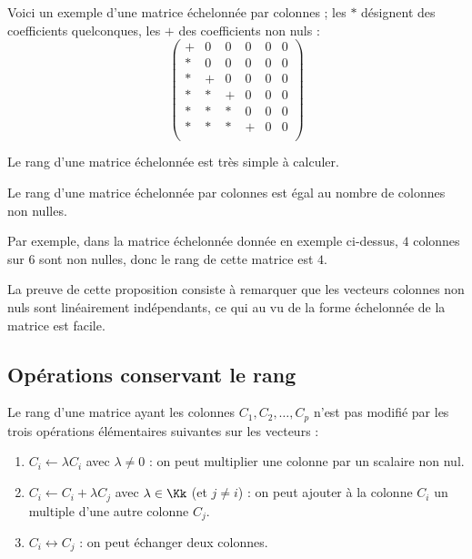 \documentclass[class=report,crop=false]{standalone}
\begin{document}
Voici un exemple d'une matrice échelonnée par colonnes ;
les $*$ désignent des coefficients quelconques, les $+$ des coefficients non nuls :
$$
\begin{pmatrix}
+ & 0 & 0 & 0 & 0 & 0 \\
* & 0 & 0 & 0 & 0 & 0 \\
* & + & 0 & 0 & 0 & 0 \\
* & * & + & 0 & 0 & 0 \\
* & * & * & 0 & 0 & 0 \\
* & * & * & + & 0 & 0 \\
\end{pmatrix}
$$

Le rang d'une matrice échelonnée est très simple à calculer.
\begin{proposition}
\label{prop:rangmatech}
Le rang d'une matrice échelonnée par colonnes est égal au nombre
de colonnes non nulles.
\end{proposition}

Par exemple, dans la matrice échelonnée donnée en exemple
ci-dessus, $4$ colonnes sur $6$ sont non nulles, donc le rang
de cette matrice est $4$.

La preuve de cette proposition consiste à remarquer que
les vecteurs colonnes non nuls sont linéairement indépendants,
ce qui au vu de la forme échelonnée de la matrice est facile.

\subsection{Opérations conservant le rang}


\begin{proposition}
\label{prop:opcolonnes}
Le rang d'une matrice ayant les colonnes $C_1, C_2, \ldots, C_p$
n'est pas modifié par les trois opérations élémentaires suivantes sur les
vecteurs :
\begin{enumerate}
  \item $C_i \leftarrow \lambda C_i$ avec $\lambda \neq 0$ :
  on peut multiplier une colonne par un scalaire non nul.

  \item $C_i \leftarrow C_i+\lambda C_j$ avec $\lambda \in \Kk$ (et $j\neq i$) :
  on peut ajouter à la colonne $C_i$ un multiple d'une autre colonne $C_j$.

  \item $C_i \leftrightarrow C_j$ : on peut échanger deux colonnes.
\end{enumerate}
\end{proposition}
\end{document}
